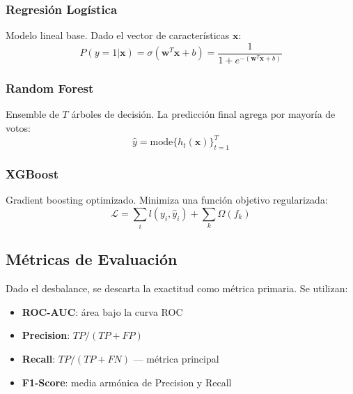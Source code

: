 \subsubsection{Regresión Logística}
Modelo lineal base. Dado el vector de características $\mathbf{x}$:
\begin{equation}
P(y=1|\mathbf{x}) = \sigma(\mathbf{w}^T\mathbf{x} + b) = \frac{1}{1+e^{-(\mathbf{w}^T\mathbf{x}+b)}}
\end{equation}

\subsubsection{Random Forest}
Ensemble de $T$ árboles de decisión. La predicción final agrega por
mayoría de votos:
\begin{equation}
\hat{y} = \text{mode}\{h_t(\mathbf{x})\}_{t=1}^{T}
\end{equation}

\subsubsection{XGBoost}
Gradient boosting optimizado. Minimiza una función objetivo regularizada:
\begin{equation}
\mathcal{L} = \sum_i l(y_i, \hat{y}_i) + \sum_k \Omega(f_k)
\end{equation}

\subsection{Métricas de Evaluación}
Dado el desbalance, se descarta la exactitud como métrica primaria.
Se utilizan:
\begin{itemize}
  \item \textbf{ROC-AUC}: área bajo la curva ROC
  \item \textbf{Precision}: $TP / (TP + FP)$
  \item \textbf{Recall}: $TP / (TP + FN)$ — métrica principal
  \item \textbf{F1-Score}: media armónica de Precision y Recall
\end{itemize}
